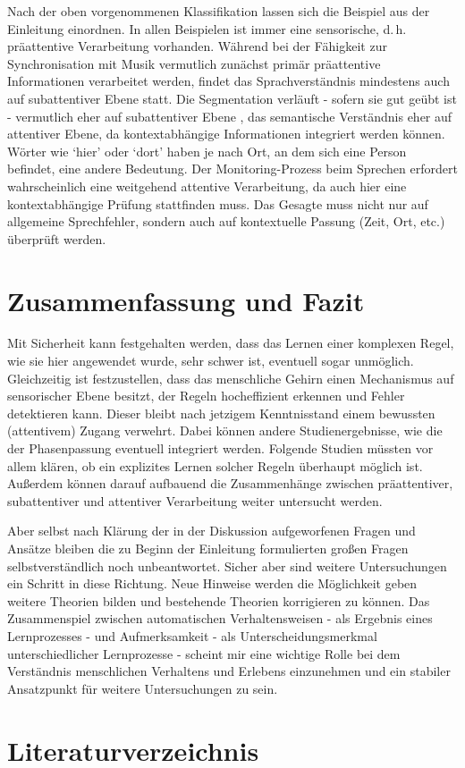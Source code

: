 \documentclass[doc,a4paper,12pt]{apa6}
\begin{document}
Nach der oben vorgenommenen Klassifikation lassen sich die Beispiel aus der Einleitung einordnen. In allen Beispielen ist immer eine sensorische, d.\,h. präattentive Verarbeitung vorhanden. Während bei der Fähigkeit zur Synchronisation mit Musik vermutlich zunächst primär präattentive Informationen verarbeitet werden, findet das Sprachverständnis mindestens auch auf subattentiver Ebene statt. Die Segmentation verläuft - sofern sie gut geübt ist - vermutlich eher auf subattentiver Ebene \parencite{sanders2002segmenting}, das semantische Verständnis eher auf attentiver Ebene, da kontextabhängige Informationen integriert werden können. Wörter wie `hier' oder `dort' haben je nach Ort, an dem sich eine Person befindet, eine andere Bedeutung. Der Monitoring-Prozess \parencites{levelt1983monitoring,postma2000detection} beim Sprechen erfordert wahrscheinlich eine weitgehend attentive Verarbeitung, da auch hier eine kontextabhängige Prüfung stattfinden muss. Das Gesagte muss nicht nur auf allgemeine Sprechfehler, sondern auch auf kontextuelle Passung (Zeit, Ort, etc.) überprüft werden.

\section{Zusammenfassung und Fazit}

Mit Sicherheit kann festgehalten werden, dass das Lernen einer komplexen Regel, wie sie hier angewendet wurde, sehr schwer ist, eventuell sogar unmöglich. Gleichzeitig ist festzustellen, dass das menschliche Gehirn einen Mechanismus auf sensorischer Ebene besitzt, der Regeln hocheffizient erkennen und Fehler detektieren kann. Dieser bleibt nach jetzigem Kenntnisstand einem bewussten (attentivem) Zugang verwehrt. Dabei können andere Studienergebnisse, wie die der Phasenpassung eventuell integriert werden. Folgende Studien müssten vor allem klären, ob ein explizites Lernen solcher Regeln überhaupt möglich ist. Außerdem können darauf aufbauend die Zusammenhänge zwischen präattentiver, subattentiver und attentiver Verarbeitung weiter untersucht werden.

Aber selbst nach Klärung der in der Diskussion aufgeworfenen Fragen und Ansätze bleiben die zu Beginn der Einleitung formulierten großen Fragen selbstverständlich noch unbeantwortet. Sicher aber sind weitere Untersuchungen ein Schritt in diese Richtung. Neue Hinweise werden die Möglichkeit geben weitere Theorien bilden und bestehende Theorien korrigieren zu können. Das Zusammenspiel zwischen automatischen Verhaltensweisen - als Ergebnis eines Lernprozesses - und Aufmerksamkeit - als Unterscheidungsmerkmal unterschiedlicher Lernprozesse - scheint mir eine wichtige Rolle bei dem Verständnis menschlichen Verhaltens und Erlebens einzunehmen und ein stabiler Ansatzpunkt für weitere Untersuchungen zu sein.


\section{Literaturverzeichnis}

\printbibliography[heading=none]
\end{document}
